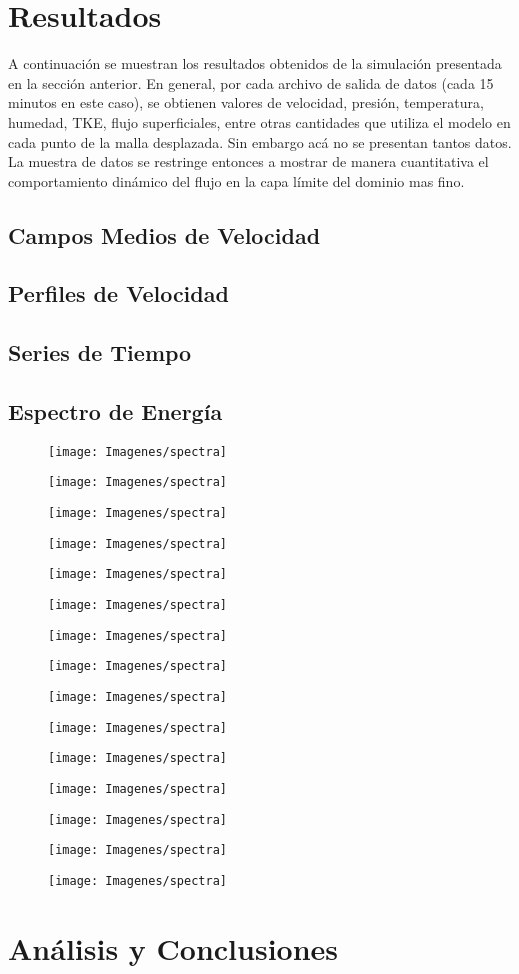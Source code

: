\chapter{Resultados}
A continuación se muestran los resultados obtenidos de la simulación presentada en la sección anterior. En general, por cada archivo de salida de datos (cada 15 minutos en este caso), se obtienen valores de velocidad, presión, temperatura, humedad, TKE, flujo superficiales, entre otras cantidades que utiliza el modelo en cada punto de la malla desplazada. Sin embargo acá no se presentan tantos datos. La muestra de datos se restringe entonces a mostrar de manera cuantitativa el comportamiento dinámico del flujo en la capa límite del dominio mas fino.
\section{Campos Medios de Velocidad}
\section{Perfiles de Velocidad}
\section{Series de Tiempo}
\section{Espectro de Energía}
\newcommand{\spectrafig}[1]{
\begin{figure}[H]
	\centering
	\texttt{[image: Imagenes/spectra]}
	\vspace{-5mm} 
\end{figure}
}
\spectrafig{1}
\spectrafig{2}
\spectrafig{3}
\spectrafig{4}
\spectrafig{5}
\spectrafig{6}
\spectrafig{7}
\spectrafig{8}
\spectrafig{9}
\spectrafig{10}
\spectrafig{11}
\spectrafig{12}
\spectrafig{13}
\spectrafig{14}
\spectrafig{15}
\chapter{Análisis y Conclusiones}